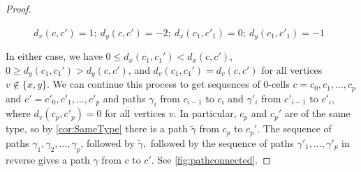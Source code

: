 \documentclass{amsart}
\theoremstyle{definition}
\theoremstyle{remark}
\begin{document}
\begin{proof}
    \begin{figure}[h!]
        \centering
        \caption{$d_x(c,c')=1;\ d_y(c,c')=-2;\ d_x(c_1,c'_1)=0;\ d_y(c_1,c'_1)=-1$}
        \label{fig:excess2}
    \end{figure}
    In either case, we have $0\le d_x(c_1,c_1')<d_x(c,c')$, $0\ge d_y(c_1,c_1')>d_y(c,c')$, and $d_v(c_1,c_1')=d_v(c,c')$ for all vertices $v\notin\{x,y\}$. We can continue this process to get sequences of 0-cells $c=c_0,c_1,\dots,c_p$ and $c'=c'_0,c'_1,\dots,c'_p$ and paths $\gamma_i$ from $c_{i-1}$ to $c_i$ and $\gamma'_i$ from $c'_{i-1}$ to $c'_i$, where $d_v(c_p,c'_p)=0$ for all vertices $v$. In particular, $c_p$ and $c_p'$ are of the same type, so by \cref{cor:SameType} there is a path $\tilde\gamma$ from $c_p$ to $c_p'.$ The sequence of paths $\gamma_1,\gamma_2,\dots,\gamma_p$, followed by $\tilde \gamma,$ followed by the sequence of paths $\gamma'_1,\dots,\gamma'_p$ in reverse gives a path $\gamma$ from $c$ to $c'.$ See \cref{fig:pathconnected}.


\end{proof}
\end{document}
